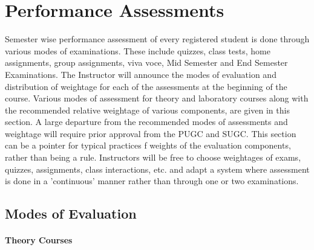 \section{Performance Assessments}

Semester wise performance assessment of every registered student is done through various modes of examinations. These include quizzes, class tests, home assignments, group assignments, viva voce, Mid Semester and End Semester Examinations. The Instructor will announce the modes of evaluation and distribution of weightage for each of the assessments at the beginning of the course. Various modes of assessment for theory and laboratory courses along with the recommended relative weightage of various components, are given in this section. A large departure from the recommended modes of assessments and weightage will require prior approval from the PUGC and SUGC. This section can be a pointer for typical practices f weights of the evaluation components, rather than being a rule. Instructors will be free to choose weightages of exams, quizzes, assignments, class interactions, etc. and adapt a system where assessment is done in a 'continuous' manner rather than through one or two examinations.

\subsection{Modes of Evaluation}

\paragraph{Theory Courses}

